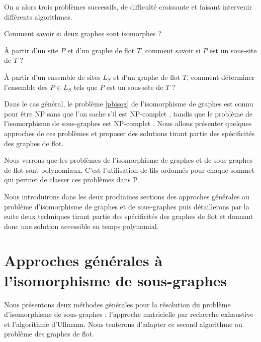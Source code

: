 On a alors trois problèmes successifs, de difficulté croissante et faisant intervenir différents algorithmes.
\begin{pb}\label{pbisog}
 Comment savoir si deux graphes sont isomorphes ?
\end{pb}

\begin{pb}\label{pbisosg}
 À partir d'un site $P$ et d'un graphe de flot $T$, comment savoir si $P$ est un sous-site de $T$ ?
\end{pb}


\begin{pb}\label{pbisosgbase}
 À partir d'un ensemble de sites $L_S$ et d'un graphe de flot $T$, comment déterminer l'ensemble des $P\in L_S$ tels que $P$ est un sous-site de $T$ ?
\end{pb}

Dans le cas général, le problème \ref{pbisog} de l'isomorphisme de graphes est connu pour être NP sans que l'on sache s'il est NP-complet \cite{Kob94}, tandis que le problème de l'isomorphisme de sous-graphes est NP-complet \cite{W05}.
Nous allons présenter quelques approches de ces problèmes et proposer des solutions tirant partie des spécificités des graphes de flot.

Nous verrons que les problèmes de l'isomorphisme de graphes et de sous-graphes de flot sont polynomiaux.
C'est l'utilisation de fils ordonnés pour chaque sommet qui permet de classer ces problèmes dans P.

Nous introduirons dans les deux prochaines sections des approches générales au problème d'isomorphisme de graphes et de sous-graphes puis détaillerons par la suite deux techniques tirant partie des spécificités des graphes de flot et donnant donc une solution accessible en temps polynomial.

\section{Approches générales à l'isomorphisme de sous-graphes}
Nous présentons deux méthodes générales pour la résolution du problème d'isomorphisme de sous-graphes : l'approche matricielle par recherche exhaustive et l'algorithme d'Ullmann. Nous tenterons d'adapter ce second algorithme au problème des graphes de flot.

